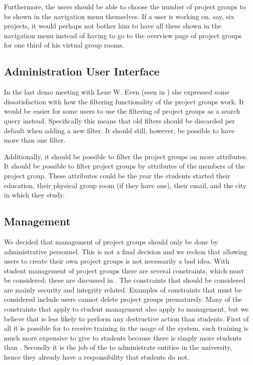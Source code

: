 Furthermore, the users should be able to choose the number of project groups to be shown in the navigation menu themselves.
If a user is working on, say, six projects, it would perhaps not bother him to have all these shown in the navigation menu instead of having to go to the overview page of project groups for one third of his virtual group rooms.

\subsection{Administration User Interface}
In the last demo meeting with Lene W. Even (seen in ) she expressed some dissatisfaction with how the filtering functionality of the project groups work.
It would be easier for some users to use the filtering of project groups as a search query instead.
Specifically this means that old filters should be discarded per default when adding a new filter.
It should still, however, be possible to have more than one filter.

Additionally, it should be possible to filter the project groups on more attributes.
It should be possible to filter project groups by attributes of the members of the project group.
These attributes could be the year the students started their education, their physical group room (if they have one), their email, and the city in which they study.


\subsection{Management}
\label{sec:evalAdministration}
We decided that management of project groups should only be done by administrative personnel. 
This is not a final decision and we reckon that allowing users to create their own project groups is not necessarily a bad idea. 
With student management of project groups there are several constraints, which must be considered; these are discussed in . 
The constraints that should be considered are mainly security and integrity related.
Examples of constraints that must be considered include users cannot delete project groups prematurely.
Many of the constraints that apply to student management also apply to \admpers{} management, but we believe that \admpers{} is less likely to perform any destructive action than students.
First of all it is possible for \admpers{} to receive training in the usage of the system, such training is much more expensive to give to students because there is simply more students than \admpers{}.
Secondly it is the job of the \admpers{} to administrate entities in the university, hence they already have a responsibility that students do not.

